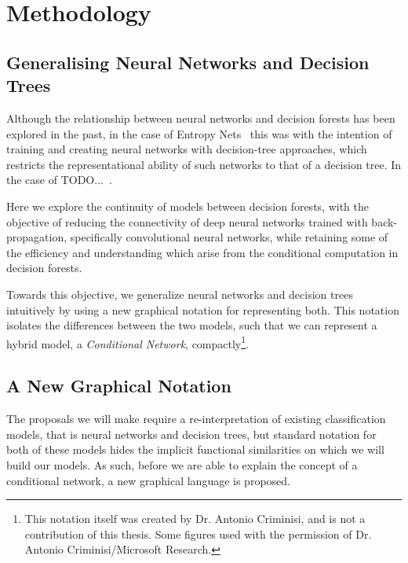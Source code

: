 \documentclass[thesis]{subfiles}
\begin{document}
\chapter{Methodology}
\label{methodology}
\ifpdf
    \graphicspath{{Figs/Raster/}{Figs/PDF/}{Figs/}}
\else
    \graphicspath{{Figs/Vector/}{Figs/}}
\fi

\section{Generalising Neural Networks and Decision Trees}
Although the relationship between neural networks and decision forests has been explored in the past, in the case of Entropy Nets~\cite{Sethi1990} this was with the intention of training and creating neural networks with decision-tree approaches, which restricts the representational ability of such networks to that of a decision tree. In the case of TODO...~\cite{Welbl2014casting}.

Here we explore the continuity of models between decision forests, with the objective of reducing the connectivity of deep neural networks trained with back-propagation, specifically convolutional neural networks, while retaining some of the efficiency and understanding which arise from the conditional computation in decision forests.

Towards this objective, we generalize neural networks and decision trees intuitively by using a new graphical notation for representing both. This notation isolates the differences between the two models, such that we can represent a hybrid model, \ie a \emph{Conditional Network}, compactly\footnote{This notation itself was created by Dr. Antonio Criminisi, and is not a contribution of this thesis. Some figures used with the permission of Dr. Antonio Criminisi/Microsoft Research.}.

\section{A New Graphical Notation}
The proposals we will make require a re-interpretation of existing classification models, that is neural networks and decision trees, but standard notation for both of these models hides the implicit functional similarities on which we will build our models. As such, before we are able to explain the concept of a conditional network, a new graphical language is proposed.
\end{document}

